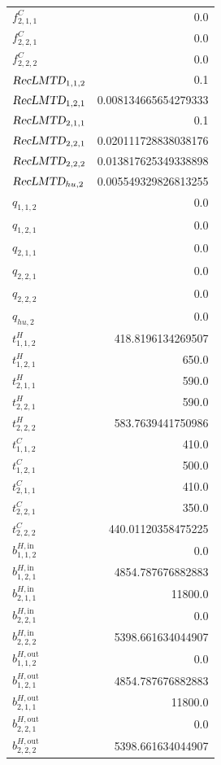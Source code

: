 \documentclass{article}%
\begin{document}
\begin{multicols*}{3}
\begin{supertabular}{lr}
	$f_{2,1,1}^{C}$ & 0.0 \\%
	$f_{2,2,1}^{C}$ & 0.0 \\%
	$f_{2,2,2}^{C}$ & 0.0 \\%
	$\textsl{RecLMTD}_{1,1,2}$ & 0.1 \\%
	$\textsl{RecLMTD}_{1,2,1}$ & 0.008134665654279333 \\%
	$\textsl{RecLMTD}_{2,1,1}$ & 0.1 \\%
	$\textsl{RecLMTD}_{2,2,1}$ & 0.020111728838038176 \\%
	$\textsl{RecLMTD}_{2,2,2}$ & 0.013817625349338898 \\%
	$\textsl{RecLMTD}_{hu,2}$ & 0.005549329826813255 \\%
	$q_{1,1,2}$ & 0.0 \\%
	$q_{1,2,1}$ & 0.0 \\%
	$q_{2,1,1}$ & 0.0 \\%
	$q_{2,2,1}$ & 0.0 \\%
	$q_{2,2,2}$ & 0.0 \\%
	$q_{hu,2}$ & 0.0 \\%
	$t_{1,1,2}^{H}$ & 418.8196134269507 \\%
	$t_{1,2,1}^{H}$ & 650.0 \\%
	$t_{2,1,1}^{H}$ & 590.0 \\%
	$t_{2,2,1}^{H}$ & 590.0 \\%
	$t_{2,2,2}^{H}$ & 583.7639441750986 \\%
	$t_{1,1,2}^{C}$ & 410.0 \\%
	$t_{1,2,1}^{C}$ & 500.0 \\%
	$t_{2,1,1}^{C}$ & 410.0 \\%
	$t_{2,2,1}^{C}$ & 350.0 \\%
	$t_{2,2,2}^{C}$ & 440.01120358475225 \\%
	$b_{1,1,2}^{H,\text{in}}$ & 0.0 \\%
	$b_{1,2,1}^{H,\text{in}}$ & 4854.787676882883 \\%
	$b_{2,1,1}^{H,\text{in}}$ & 11800.0 \\%
	$b_{2,2,1}^{H,\text{in}}$ & 0.0 \\%
	$b_{2,2,2}^{H,\text{in}}$ & 5398.661634044907 \\%
	$b_{1,1,2}^{H,\text{out}}$ & 0.0 \\%
	$b_{1,2,1}^{H,\text{out}}$ & 4854.787676882883 \\%
	$b_{2,1,1}^{H,\text{out}}$ & 11800.0 \\%
	$b_{2,2,1}^{H,\text{out}}$ & 0.0 \\%
	$b_{2,2,2}^{H,\text{out}}$ & 5398.661634044907 \\%

\end{supertabular}
\end{multicols*}
\end{document}
